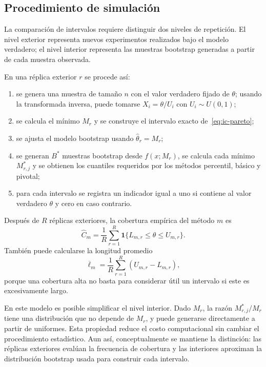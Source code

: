 \documentclass[10pt,a4paper,oneside]{article}
\newcommand{\ind}{\mathbf{1}}
\begin{document}
\subsection*{Procedimiento de simulación}

La comparación de intervalos requiere distinguir dos niveles de repetición. El nivel exterior representa nuevos experimentos realizados bajo el modelo verdadero; el nivel interior representa las muestras bootstrap generadas a partir de cada muestra observada.

En una réplica exterior $r$ se procede así:
\begin{enumerate}
\item se genera una muestra de tamaño $n$ con el valor verdadero fijado de $\theta$; usando la transformada inversa, puede tomarse $X_i=\theta/U_i$ con $U_i\sim U(0,1)$;
\item se calcula el mínimo $M_r$ y se construye el intervalo exacto de~\eqref{eq:ic-pareto};
\item se ajusta el modelo bootstrap usando $\widehat\theta_r=M_r$;
\item se generan $B^*$ muestras bootstrap desde $f(x;M_r)$, se calcula cada mínimo $M_{r,j}^*$ y se obtienen los cuantiles requeridos por los métodos percentil, básico y pivotal;
\item para cada intervalo se registra un indicador igual a uno si contiene al valor verdadero $\theta$ y cero en caso contrario.
\end{enumerate}
Después de $R$ réplicas exteriores, la cobertura empírica del método $m$ es
\begin{equation*}
\widehat C_m=\frac1R\sum_{r=1}^{R}
\ind\{L_{m,r}\leq\theta\leq U_{m,r}\}.
\end{equation*}
También puede calcularse la longitud promedio
\begin{equation*}
\overline{\ell}_m=\frac1R\sum_{r=1}^{R}(U_{m,r}-L_{m,r}),
\end{equation*}
porque una cobertura alta no basta para considerar útil un intervalo si este es excesivamente largo.

En este modelo es posible simplificar el nivel interior. Dado $M_r$, la razón $M_{r,j}^*/M_r$ tiene una distribución que no depende de $M_r$, y puede generarse directamente a partir de uniformes. Esta propiedad reduce el costo computacional sin cambiar el procedimiento estadístico. Aun así, conceptualmente se mantiene la distinción: las réplicas exteriores evalúan la frecuencia de cobertura y las interiores aproximan la distribución bootstrap usada para construir cada intervalo.
\end{document}
